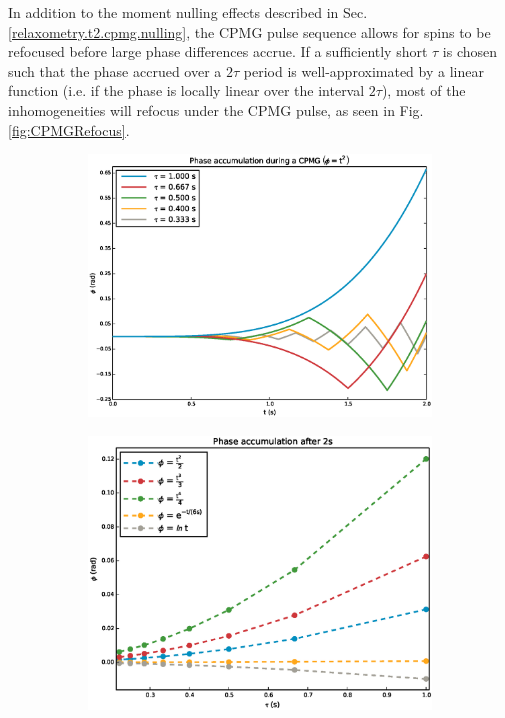 \documentclass[PaulGanssle-Thesis.tex]{subfiles}
\begin{document}
In addition to the moment nulling effects described in Sec. \ref{relaxometry.t2.cpmg.nulling}, the CPMG pulse sequence allows for spins to be refocused before large phase differences accrue. If a sufficiently short $\tau$ is chosen such that the phase accrued over a $2\tau$ period is well-approximated by a linear function (i.e. if the phase is locally linear over the interval $2\tau$), most of the inhomogeneities will refocus under the CPMG pulse, as seen in Fig. \ref{fig:CPMGRefocus}. 

\begin{figure}
\centering
\begin{subfigure}[h]{0.45\tw}
\includegraphics[width=\tw]{figures/relaxometry/PhaseAccumulationt.eps}
\caption{}
\label{sfig:PhaseAccumulationt}
\end{subfigure}
\begin{subfigure}[h]{0.45\tw}
\includegraphics[width=\tw]{figures/relaxometry/PhaseAccumulationTaus.eps}
\caption{}
\label{sfig:PhaseAccumulationTaus}
\end{subfigure}


\end{figure}
\end{document}

